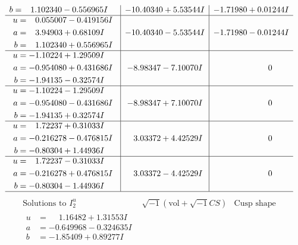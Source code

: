 \documentclass[1p]{elsarticle_modified}
\theoremstyle{definition}
\newcommand{\I}{\sqrt{-1}}
\begin{document}
$$\begin{array}{c|c|c}
\begin{aligned}
b &= \phantom{-}1.102340 - 0.556965 I\end{aligned}
 & -10.40340 + 5.53544 I & -1.71980 + 0.01244 I \\ \hline\begin{aligned}
u &= \phantom{-}0.055007 - 0.419156 I \\
a &= \phantom{-}3.94903 + 0.68109 I \\
b &= \phantom{-}1.102340 + 0.556965 I\end{aligned}
 & -10.40340 - 5.53544 I & -1.71980 - 0.01244 I \\ \hline\begin{aligned}
u &= -1.10224 + 1.29509 I \\
a &= -0.954080 + 0.431686 I \\
b &= -1.94135 - 0.32574 I\end{aligned}
 & -8.98347 - 7.10070 I & \phantom{-0.000000 } 0 \\ \hline\begin{aligned}
u &= -1.10224 - 1.29509 I \\
a &= -0.954080 - 0.431686 I \\
b &= -1.94135 + 0.32574 I\end{aligned}
 & -8.98347 + 7.10070 I & \phantom{-0.000000 } 0 \\ \hline\begin{aligned}
u &= \phantom{-}1.72237 + 0.31033 I \\
a &= -0.216278 - 0.476815 I \\
b &= -0.80304 + 1.44936 I\end{aligned}
 & \phantom{-}3.03372 + 4.42529 I & \phantom{-0.000000 } 0 \\ \hline\begin{aligned}
u &= \phantom{-}1.72237 - 0.31033 I \\
a &= -0.216278 + 0.476815 I \\
b &= -0.80304 - 1.44936 I\end{aligned}
 & \phantom{-}3.03372 - 4.42529 I & \phantom{-0.000000 } 0\\
 \hline 
 \end{array}$$\newpage$$\begin{array}{c|c|c}  
\text{Solutions to }I^u_{2}& \I (\text{vol} + \sqrt{-1}CS) & \text{Cusp shape}\\
 \hline 
\begin{aligned}
u &= \phantom{-}1.16482 + 1.31553 I \\
a &= -0.649968 - 0.324635 I \\
b &= -1.85409 + 0.89277 I\end{aligned}

\end{array}$$
\end{document}
